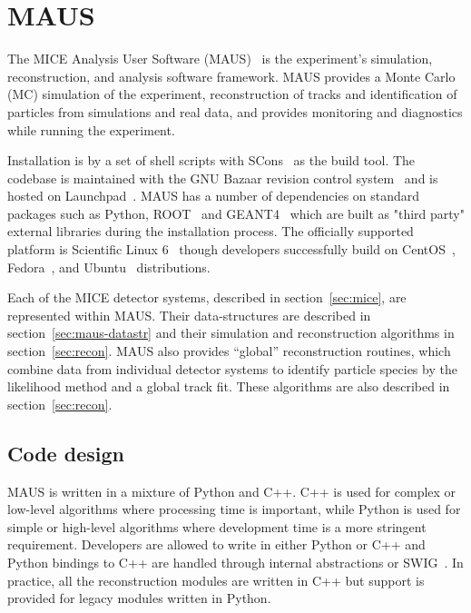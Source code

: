 \documentclass{JINST}
\begin{document}
\section{MAUS}\label{sec:maus}

The MICE  Analysis User Software (MAUS)~\cite{MausIPAC11} is the experiment's simulation, reconstruction, and  analysis software framework. MAUS provides a Monte Carlo (MC) simulation of the experiment, reconstruction of tracks and identification of particles from simulations and real data, and provides monitoring and diagnostics while running the experiment.

Installation is by a set of shell scripts with SCons~\cite{SCONS} as the build tool. The codebase is maintained with  the GNU Bazaar revision control system~\cite{bazaar} and is hosted on Launchpad~\cite{launchpad}. MAUS has a number of dependencies on standard packages such as Python, ROOT~\cite{ROOT} and GEANT4~\cite{GEANT4} which are built as "third party" external libraries during the installation process.  The officially supported platform is Scientific Linux 6~\cite{scilinux} though developers successfully build on CentOS~\cite{centos}, Fedora~\cite{fedora}, and Ubuntu~\cite{ubuntu} distributions.

Each of the MICE detector systems, described in section~\ref{sec:mice}, are represented within MAUS. Their data-structures are described in section~\ref{sec:maus-datastr} and their simulation and reconstruction algorithms in section~\ref{sec:recon}. MAUS also provides ``global'' reconstruction routines, which combine data from individual detector systems to identify particle species by the likelihood method and a global track fit. These algorithms are also described in section~\ref{sec:recon}. 


\subsection{Code design}\label{sec:maus-arch}

MAUS is written in a mixture of Python and C++. C++ is used for complex or low-level algorithms where processing time is important, while Python is used for simple or high-level algorithms where development time is a more stringent requirement. Developers are allowed to write in either Python or C++ and Python bindings to C++ are handled through internal abstractions or SWIG~\cite{SWIG}. In practice, all the reconstruction modules are written in C++ but support is provided for legacy modules written in Python.
\end{document}
